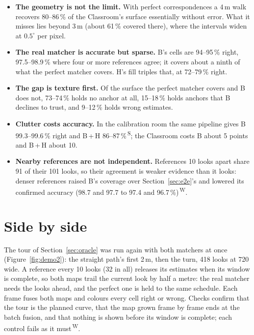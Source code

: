 \documentclass[11pt,a4paper]{article}
\newcommand{\src}[1]{\textsuperscript{\,#1}}
\newcommand{\WS}{\src{W}}   %
\newcommand{\SB}{\src{S}}   %
\begin{document}
\begin{itemize}
\item \textbf{The geometry is not the limit.} With perfect correspondences a 4\,m walk recovers 80--86\,\% of the
  Classroom's surface essentially without error. What it misses lies beyond 3\,m (about 61\,\% covered there), where the
  intervals widen at $0.5^\circ$ per pixel.
\item \textbf{The real matcher is accurate but sparse.} B's cells are 94--95\,\% right, 97.5--98.9\,\% where four or more
  references agree; it covers about a ninth of what the perfect matcher covers. H's fill triples that, at 72--79\,\% right.
\item \textbf{The gap is texture first.} Of the surface the perfect matcher covers and B does not, 73--74\,\% holds no
  anchor at all, 15--18\,\% holds anchors that B declines to trust, and 9--12\,\% holds wrong estimates.
\item \textbf{Clutter costs accuracy.} In the calibration room the same pipeline gives B 99.3--99.6\,\% right and B\,+\,H
  86--87\,\%\SB; the Classroom costs B about 5 points and B\,+\,H about 10.
\item \textbf{Nearby references are not independent.} References 10 looks apart share 91 of their 101 looks, so their
  agreement is weaker evidence than it looks: denser references raised B's coverage over Section~\ref{sec:e2e}'s and
  lowered its confirmed accuracy (98.7 and 97.7 to 97.4 and 96.7\,\%)\WS.
\end{itemize}

\section{Side by side}\label{sec:demo2}

The tour of Section~\ref{sec:oracle} was run again with both matchers at once (Figure~\ref{fig:demo2}): the straight
path's first 2\,m, then the turn, 418 looks at 720 wide. A reference every 10 looks (32 in all) releases its estimates when
its window is complete, so both maps trail the current look by half a metre: the real matcher needs the looks ahead, and
the perfect one is held to the same schedule. Each frame fuses both maps and colours every cell right or wrong. Checks
confirm that the tour is the planned curve, that the map grown frame by frame ends at the batch fusion, and that nothing
is shown before its window is complete; each control fails as it must\WS.
\end{document}
